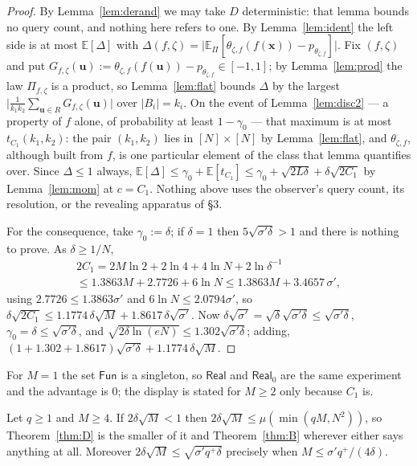 \documentclass{aicr-solution}
\newcommand{\Fun}{\mathsf{Fun}}
\newcommand{\Real}{\mathsf{Real}}
\newcommand{\Exp}{\mathbb{E}}
\newcommand{\vx}{\mathbf{x}}
\newcommand{\vu}{\mathbf{u}}
\begin{document}
\begin{proof}
By Lemma~\ref{lem:derand} we may take $D$ deterministic: that lemma bounds no query
count, and nothing here refers to one. By Lemma~\ref{lem:ident} the left side is at
most $\Exp[\Delta]$ with
$\Delta(f,\zeta)=\bigl|\Exp_{\Pi}[\theta_{\zeta,f}(f(\vx))-p_{\theta_{\zeta,f}}]\bigr|$.
Fix $(f,\zeta)$ and put
$G_{f,\zeta}(\vu):=\theta_{\zeta,f}(f(\vu))-p_{\theta_{\zeta,f}}\in[-1,1]$; by
Lemma~\ref{lem:prod} the law $\Pi_{f,\zeta}$ is a product, so Lemma~\ref{lem:flat}
bounds $\Delta$ by the largest
$\bigl|\frac{1}{k_1k_2}\sum_{\vu\in R}G_{f,\zeta}(\vu)\bigr|$ over $|B_i|=k_i$. On
the event of Lemma~\ref{lem:disc2} --- a property of $f$ alone, of probability at
least $1-\gamma_0$ --- that maximum is at most $t_{C_1}(k_1,k_2)$: the pair
$(k_1,k_2)$ lies in $[N]\times[N]$ by Lemma~\ref{lem:flat}, and $\theta_{\zeta,f}$,
although built from $f$, is one particular element of the class that lemma
quantifies over. Since $\Delta\le1$ always,
$\Exp[\Delta]\le\gamma_0+\Exp[t_{C_1}]\le\gamma_0+\sqrt{2L\delta}+\delta\sqrt{2C_1}$
by Lemma~\ref{lem:mom} at $c=C_1$. Nothing above uses the observer's query count,
its resolution, or the revealing apparatus of \S3.

For the consequence, take $\gamma_0:=\delta$; if $\delta=1$ then
$5\sqrt{\sigma'\delta}>1$ and there is nothing to prove. As $\delta\ge1/N$,
\begin{multline*}
  2C_1=2M\ln2+2\ln4+4\ln N+2\ln\delta^{-1}\\
  \le1.3863M+2.7726+6\ln N\le1.3863M+3.4657\,\sigma',
\end{multline*}
using $2.7726\le1.3863\sigma'$ and $6\ln N\le2.0794\sigma'$, so
$\delta\sqrt{2C_1}\le1.1774\,\delta\sqrt M+1.8617\,\delta\sqrt{\sigma'}$. Now
$\delta\sqrt{\sigma'}=\sqrt\delta\sqrt{\sigma'\delta}\le\sqrt{\sigma'\delta}$,
$\gamma_0=\delta\le\sqrt{\sigma'\delta}$, and
$\sqrt{2\delta\ln(eN)}\le1.302\sqrt{\sigma'\delta}$; adding,
$(1+1.302+1.8617)\sqrt{\sigma'\delta}+1.1774\,\delta\sqrt M$.
\end{proof}

For $M=1$ the set $\Fun$ is a singleton, so $\Real$ and $\Real_0$ are the same
experiment and the advantage is $0$; the display is stated for $M\ge2$ only because
$C_1$ is.

\begin{corollary}\label{cor:D}
Let $q\ge1$ and $M\ge4$. If $2\delta\sqrt M<1$ then
$2\delta\sqrt M\le\mu(\min(qM,N^{2}))$, so Theorem~\ref{thm:D} is the smaller of it
and Theorem~\ref{thm:B} wherever either says anything at all. Moreover
$2\delta\sqrt M\le\sqrt{\sigma'q^{+}\delta}$ precisely when
$M\le\sigma'q^{+}/(4\delta)$.
\end{corollary}
\end{document}
